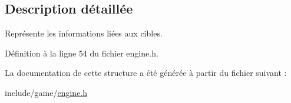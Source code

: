 \subsection{Description détaillée}
Représente les informations liées aux cibles. 

Définition à la ligne 54 du fichier engine.\+h.



La documentation de cette structure a été générée à partir du fichier suivant \+:\begin{DoxyCompactItemize}
\item 
include/game/\hyperlink{engine_8h}{engine.\+h}\end{DoxyCompactItemize}

